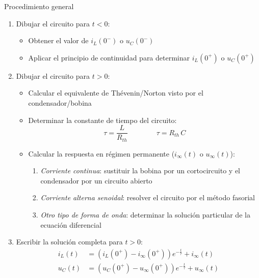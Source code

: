 \documentclass[aspectratio=169, xcolor={usenames,svgnames,dvipsnames}]{beamer}
\begin{document}
\begin{frame}{Procedimiento general}
\begin{enumerate}
\item Dibujar el circuito para $t < 0$:
        \begin{itemize}
        \item Obtener el valor de $i_L(0^-)$ o $u_C(0^-)$
        \item Aplicar el principio de continuidad para determinar $i_L(0^+)$ o $u_C(0^+)$ 
        \end{itemize}
    \item Dibujar el circuito para \(t > 0\):
        \begin{itemize}
        \item Calcular el equivalente de Thévenin/Norton visto por el condensador/bobina
        \item Determinar la constante de tiempo del circuito:
        \begin{equation*}
            \tau = \dfrac{L}{R_{th}} \qquad\qquad \tau = R_{th}\,{C}
        \end{equation*}
        \item Calcular la respuesta en régimen permanente ($i_\infty(t)$ o $u_\infty(t)$):
        \begin{enumerate}
	        \item \textit{Corriente continua}: sustituir la bobina por un cortocircuito y el condensador por un circuito abierto
	        \item \textit{Corriente alterna senoidal}: resolver el circuito por el método fasorial
	        \item \textit{Otro tipo de forma de onda}: determinar la solución particular de la ecuación diferencial
	    \end{enumerate}
        \end{itemize}
    \item Escribir la solución completa para $t>0$:
    \begin{align*}
    i_L(t) &= \left(i_L(0^+) - i_\infty(0^+)\right) e^{-\frac{t}{\tau}} + i_\infty(t)\\
    u_C(t) &= \left(u_C(0^+) - u_\infty(0^+)\right) e^{-\frac{t}{\tau}} + u_\infty(t)\\
    \end{align*}
	\end{enumerate}
\end{frame}
\end{document}
